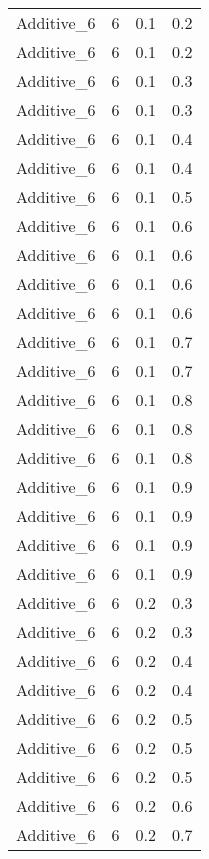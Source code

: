 \documentclass{article}
\begin{document}
\begin{longtable}[H]{lrrr}
 Additive\_6 &       6 &   0.1 &            0.2 \\
 Additive\_6 &       6 &   0.1 &            0.2 \\
 Additive\_6 &       6 &   0.1 &            0.3 \\
 Additive\_6 &       6 &   0.1 &            0.3 \\
 Additive\_6 &       6 &   0.1 &            0.4 \\
 Additive\_6 &       6 &   0.1 &            0.4 \\
 Additive\_6 &       6 &   0.1 &            0.5 \\
 Additive\_6 &       6 &   0.1 &            0.6 \\
 Additive\_6 &       6 &   0.1 &            0.6 \\
 Additive\_6 &       6 &   0.1 &            0.6 \\
 Additive\_6 &       6 &   0.1 &            0.6 \\
 Additive\_6 &       6 &   0.1 &            0.7 \\
 Additive\_6 &       6 &   0.1 &            0.7 \\
 Additive\_6 &       6 &   0.1 &            0.8 \\
 Additive\_6 &       6 &   0.1 &            0.8 \\
 Additive\_6 &       6 &   0.1 &            0.8 \\
 Additive\_6 &       6 &   0.1 &            0.9 \\
 Additive\_6 &       6 &   0.1 &            0.9 \\
 Additive\_6 &       6 &   0.1 &            0.9 \\
 Additive\_6 &       6 &   0.1 &            0.9 \\
 Additive\_6 &       6 &   0.2 &            0.3 \\
 Additive\_6 &       6 &   0.2 &            0.3 \\
 Additive\_6 &       6 &   0.2 &            0.4 \\
 Additive\_6 &       6 &   0.2 &            0.4 \\
 Additive\_6 &       6 &   0.2 &            0.5 \\
 Additive\_6 &       6 &   0.2 &            0.5 \\
 Additive\_6 &       6 &   0.2 &            0.5 \\
 Additive\_6 &       6 &   0.2 &            0.6 \\
 Additive\_6 &       6 &   0.2 &            0.7 \\

\end{longtable}
\end{document}
